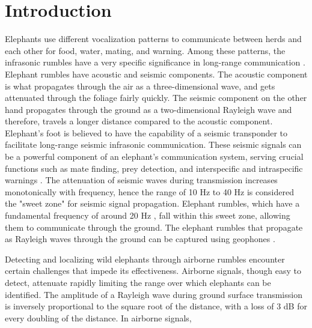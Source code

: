 \documentclass[applsci,article,accept,moreauthors,pdftex]{Definitions/mdpi}
\begin{document}
\section{Introduction}
Elephants use different vocalization patterns to communicate between herds and each other for food, water, mating, and warning. Among these patterns, the infrasonic rumbles have a very specific significance in long-range communication \cite{nair2009vocalizations}. Elephant rumbles have acoustic and seismic components. The acoustic component is what propagates through the air as a three-dimensional wave, and gets attenuated through the foliage fairly quickly. The seismic component on the other hand propagates through the ground as a two-dimensional Rayleigh wave and therefore, travels a longer distance compared to the acoustic component. Elephant's foot is believed to have the capability of a seismic transponder to facilitate long-range seismic infrasonic communication. These seismic signals can be a powerful component of an elephant’s communication system, serving crucial functions such as mate finding, prey detection, and interspecific and intraspecific warnings \cite{o2000seismic}. The attenuation of seismic waves during transmission increases monotonically with frequency, hence the range of 10 Hz to 40 Hz is considered the "sweet zone" for seismic signal propagation. Elephant rumbles, which have a fundamental frequency of around 20 Hz \cite{payne1986infrasonic}, fall within this sweet zone, allowing them to communicate through the ground. The elephant rumbles that propagate as Rayleigh waves through the ground can be captured using geophones \cite{gunther2004seismic}.\par
Detecting and localizing wild elephants through airborne rumbles encounter certain challenges that impede its effectiveness. Airborne signals, though easy to detect, attenuate rapidly limiting the range over which elephants can be identified. The amplitude of a Rayleigh wave during ground surface transmission is inversely proportional to
the square root of the distance, with a loss of 3 dB for every doubling of the distance. In airborne signals,
\end{document}

